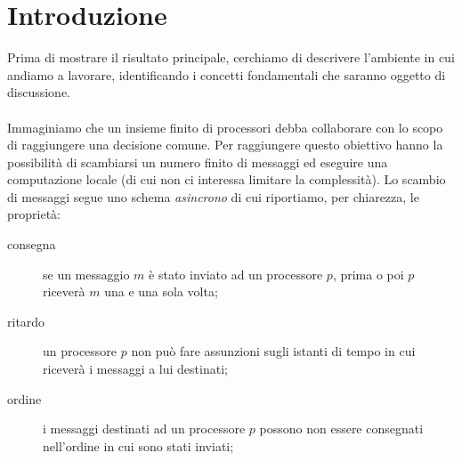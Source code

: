 \documentclass{article}
\begin{document}
\title{\rmfamily\normalfont{}}
\author{\\
	\\
	}
\date{} %

\maketitle


\begin{abstract}
  In questo lavoro ci proponiamo di studiare il risultato di
  impossilit\`a del consenso in un sistema totalmente asincrono,
  dimostrato da Fischer, Lynch e Paterson nel 1985.

  Nella nostra esposizione intendiamo riportare i principali risultati
  raggiunti dagli autori, integrando alcuni dettagli con brevi
  interventi che abbiamo sviluppato durante lo studio.

  Questo nostro elaborato \`e diviso in due macro sezioni: la prima ha
  un taglio pi\`u teorico e tratta la prova d'impossibilit\`a; la
  seconda, invece, ha un taglio pi\`u implementativo e propone uno
  schema per risolvere il problema del consenso, aggiungendo alcune
  ipotesi.
\end{abstract}
       
\tableofcontents

\section{Introduzione}
\label{sec:intro}
Prima di mostrare il risultato principale, cerchiamo di descrivere
l'ambiente in cui andiamo a lavorare, identificando i concetti
fondamentali che saranno oggetto di discussione.\\\\
Immaginiamo che un insieme finito di processori debba collaborare con
lo scopo di raggiungere una decisione comune. Per raggiungere questo
obiettivo hanno la possibilit\`a di scambiarsi un numero finito di
messaggi ed eseguire una computazione locale (di cui non ci interessa
limitare la complessit\`a). Lo scambio di messaggi segue uno schema
\emph{asincrono} di cui riportiamo, per chiarezza, le propriet\`a:
\begin{description}
\item[consegna] se un messaggio $m$ \`e stato inviato ad un processore
  $p$, prima o poi $p$ ricever\`a $m$ una e una sola volta;
\item[ritardo] un processore $p$ non pu\`o fare assunzioni sugli
  istanti di tempo in cui ricever\`a i messaggi a lui destinati;
\item[ordine] i messaggi destinati ad un processore $p$ possono non
  essere consegnati nell'ordine in cui sono stati inviati;
\end{description}
\end{document}
